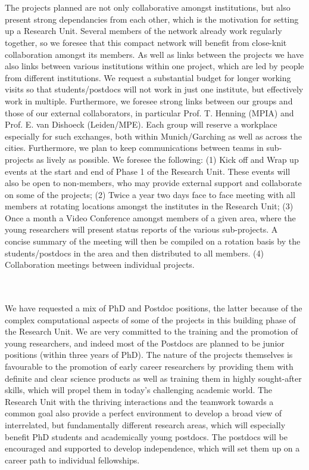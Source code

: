 \documentclass[12pt]{article}
\begin{document}
\mbox{}\vspace{1em}\\
\\
\noindent The projects planned are not only collaborative amongst institutions,
but also present strong dependancies from each other, which is the
motivation for setting up a Research Unit. Several members of the
network already work regularly together, so we foresee that this compact
network will benefit from close-knit collaboration amongst its members.
As well as links between the projects we have also links between
various institutions within one project, which are led by people from
different institutions. We request a substantial budget for longer
working visits so that students/postdocs will not work in just one
institute, but effectively work in multiple. Furthermore, we foresee
strong links between our groups and those of our external
collaborators, in particular Prof. T. Henning (MPIA) and Prof. E. van
Dishoeck (Leiden/MPE). Each group will reserve a workplace especially for such exchanges, both within Munich/Garching as well as across the cities. 
Furthermore, we plan to keep communications between teams in
sub-projects as lively as possible. We foresee the following: (1) Kick
off and Wrap up events at the start and end of Phase 1 of the Research
Unit. These events will also be open to non-members, who may provide
external support and collaborate on some of the projects; (2) Twice a
year two days face to face meeting with all members at rotating
locations amongst the institutes in the Research Unit; (3) Once a
month a Video Conference amongst members of a given area, where the young
researchers will present status reports of the various sub-projects. A
concise summary of the meeting will then be compiled on a rotation
basis by the students/postdocs in the area and then distributed to
all members. (4) Collaboration meetings between individual projects.

\mbox{}\vspace{1em}\\
\\
%
\noindent We have requested a mix of PhD and Postdoc positions, the
latter because of the complex computational aspects of some of the
projects in this building phase of the Research Unit. We are very
committed to the training and the promotion of young researchers, and
indeed most of the Postdocs are planned to be junior positions (within
three years of PhD). The nature of the projects themselves is
favourable to the promotion of early career researchers by providing
them with definite and clear science products as well as training them
in highly sought-after skills, which will propel them in today's
challenging academic world. The Research Unit with the thriving
interactions and the teamwork towards a common goal also provide a
perfect environment to develop a broad view of interrelated, but
fundamentally different research areas, which will especially benefit
PhD students and academically young postdocs. The postdocs will be
encouraged and supported to develop independence, which will set them
up on a career path to individual fellowships. 
\end{document}
